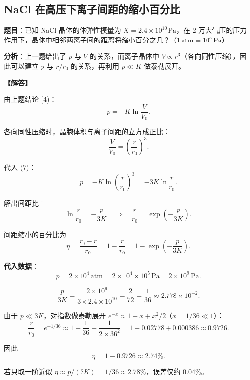 \subsection{NaCl 在高压下离子间距的缩小百分比}

\textbf{题目}：已知 NaCl 晶体的体弹性模量为 $K = 2.4\times 10^{10}\,\text{Pa}$，在 $2$ 万大气压的压力作用下，晶体中相邻两离子间的距离将缩小百分之几？（$1\,\text{atm} = 10^5\,\text{Pa}$）

\textbf{分析}：上一题给出了 $p$ 与 $V$ 的关系，而离子晶体中 $V \propto r^3$（各向同性压缩），因此可以建立 $p$ 与 $r/r_0$ 的关系，再利用 $p \ll K$ 做泰勒展开。

\vspace{0.5em}
\textbf{【解答】}

由上题结论 (4)：
\[
  p = -K\ln\frac{V}{V_0} .
\tag{7}
\]

各向同性压缩时，晶胞体积与离子间距的立方成正比：
\[
  \frac{V}{V_0} = \left(\frac{r}{r_0}\right)^{\!3} .
\tag{8}
\]

代入 (7)：
\[
  p = -K\ln\!\left(\frac{r}{r_0}\right)^{\!3}
    = -3K\ln\frac{r}{r_0} .
\tag{9}
\]

解出间距比：
\[
  \ln\frac{r}{r_0} = -\frac{p}{3K}
  \quad\Longrightarrow\quad
  \frac{r}{r_0} = \exp\!\left(-\frac{p}{3K}\right) .
\tag{10}
\]

间距缩小的百分比为
\[
  \eta = \frac{r_0 - r}{r_0} = 1 - \frac{r}{r_0}
       = 1 - \exp\!\left(-\frac{p}{3K}\right) .
\tag{11}
\]

\textbf{代入数据}：
\[
  p = 2\times 10^4\,\text{atm}
    = 2\times 10^4 \times 10^5\,\text{Pa}
    = 2\times 10^9\,\text{Pa} .
\]

\[
  \frac{p}{3K} = \frac{2\times 10^9}{3\times 2.4\times 10^{10}}
               = \frac{2}{72}
               = \frac{1}{36}
               \approx 2.778\times 10^{-2} .
\tag{12}
\]

由于 $p \ll 3K$，对指数做泰勒展开 $e^{-x} \approx 1 - x + x^2/2$（$x = 1/36 \ll 1$）：
\[
  \frac{r}{r_0} = e^{-1/36}
               \approx 1 - \frac{1}{36} + \frac{1}{2\times 36^2}
               = 1 - 0.02778 + 0.000386
               \approx 0.9726 .
\]

因此
\[
  \boxed{\eta = 1 - 0.9726 \approx 2.74\%} .
\]

若只取一阶近似 $\eta \approx p/(3K) = 1/36 \approx 2.78\%$，误差仅约 $0.04\%$。

